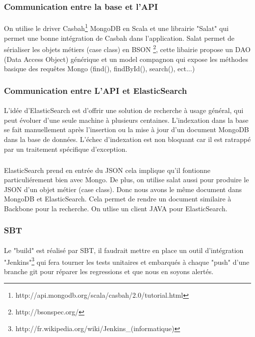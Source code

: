 \subsubsection{Communication entre la base et l'API}
\paragraph{}
On utilise le driver Casbah\footnote{http://api.mongodb.org/scala/casbah/2.0/tutorial.html} MongoDB en Scala et une librairie "Salat" qui permet une bonne intégration de Casbah dans l'application.
Salat permet de sérialiser les objets métiers (case class) en BSON \footnote{http://bsonspec.org/}, cette libairie propose un DAO (Data Access Object) générique et un model compagnon qui expose les méthodes basique des requêtes Mongo (find(), findById(), search(), ect...)
\subsubsection{Communication entre L'API et ElasticSearch}
\paragraph{}
L’idée d’ElasticSearch est d’offrir une solution de recherche à usage général, qui peut évoluer d’une seule machine à plusieurs centaines.  
L'indexation dans la base se fait manuellement après l'insertion ou la mise à jour d'un document MongoDB dans la base de données.
L'échec d'indexation est non bloquant car il est ratrappé par un traitement spécifique d'exception.
\subparagraph{}
ElasticSearch prend en entrée du JSON cela implique qu'il fontionne particuliérement bien avec Mongo.
De plus, on utilise salat aussi pour produire le JSON d'un objet métier (case class).
Donc nous avons le même document dans MongoDB et ElasticSearch. Cela permet de rendre un document similaire à Backbone pour la recherche.
On utlise un client JAVA pour ElasticSearch.
\subsubsection{SBT}
\paragraph{}
Le "build" est réalisé par SBT, il faudrait mettre en place un outil d'intégration "Jenkins"\footnote{http://fr.wikipedia.org/wiki/Jenkins\_(informatique)} qui fera tourner les tests unitaires et embarqués à chaque "push" d'une branche git pour réparer les regressions et que nous en soyons alertés.
